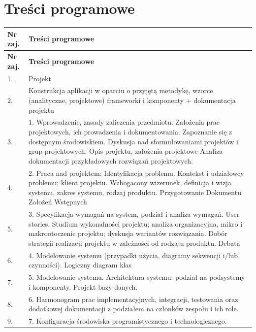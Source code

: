 \documentclass[12pt, a4paper]{article}
\newcommand{\thdrule}{\noalign{\global\setlength{\extrarowheight}{0pt}}}
\newcommand{\thdend}{\noalign{\global\setlength{\extrarowheight}{3pt}}}
\begin{document}
\section{Treści programowe}

{\scriptsize
\begin{longtable}{m{1.5cm}m{14.5cm}}
\thdrule\toprule
\rowcolor{pjatkRed} {\color{white}\textbf{Nr zaj.}} & {\color{white}\textbf{Treści programowe}} \\
\midrule\thdend
\endfirsthead
\thdrule\toprule
\rowcolor{pjatkRed} {\color{white}\textbf{Nr zaj.}} & {\color{white}\textbf{Treści programowe}} \\
\midrule\thdend
\endhead
  \rowcolor{tableRowLight} 1. & Projekt \\
  \rowcolor{tableRowAlt} 2. & Konstrukcja aplikacji w oparciu o przyjętą metodykę, wzorce (analityczne, projektowe) frameworki i komponenty + dokumentacja projektu \\
  \rowcolor{tableRowLight} 3. & 1. Wprowadzenie, zasady zaliczenia przedmiotu. Założenia prac projektowych, ich prowadzenia i dokumentowania. Zapoznanie się z dostępnym środowiskiem. Dyskusja nad sformułowaniami projektów i grup projektowych. Opis projektu, założenia projektowe Analiza dokumentacji przykładowych rozwiązań projektowych. \\
  \rowcolor{tableRowAlt} 4. & 2. Praca nad projektem: Identyfikacja problemu. Kontekst i udziałowcy problemu; klient projektu. Wzbogacony wizerunek, definicja i wizja systemu, zakres systemu, rodzaj produktu. Przygotowanie Dokumentu Założeń Wstępnych \\
  \rowcolor{tableRowLight} 5. & 3. Specyfikacja wymagań na system, podział i analiza wymagań. User stories. Studium wykonalności projektu; analiza organizacyjna, mikro i makrootoczenie projektu; dyskusja wariantów rozwiązania. Dobór strategii realizacji projektu w zależności od rodzaju produktu. Debata \\
  \rowcolor{tableRowAlt} 6. & 4. Modelowanie systemu (przypadki użycia, diagramy sekwencji i/lub czynności). Logiczny diagram klas \\
  \rowcolor{tableRowLight} 7. & 5. Modelowanie systemu. Architektura systemu: podział na podsystemy i komponenty. Projekt bazy danych. \\
  \rowcolor{tableRowAlt} 8. & 6. Harmonogram prac implementacyjnych, integracji, testowania oraz dodatkowej dokumentacji z podziałem na członków zespołu i ich role. \\
  \rowcolor{tableRowLight} 9. & 7. Konfiguracja środowiska programistycznego i technologicznego. \\

\end{longtable}}
\end{document}
